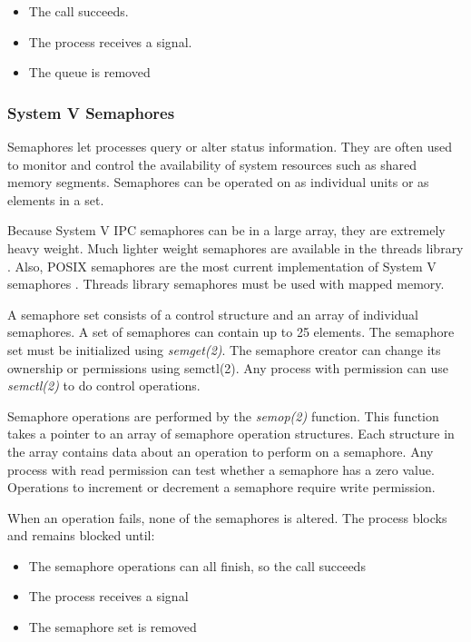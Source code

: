 \documentclass[12pt]{article}
\begin{document}
\begin{itemize}
	\item The call succeeds.
	
	
	\item The process receives a signal.	
		
	\item The queue is removed

\end{itemize}	


\subsubsection{System V Semaphores}

Semaphores let processes query or alter status information. They are often used to monitor and control the availability of system resources such as shared memory segments. Semaphores can be operated on as individual units or as elements in a set.

Because System V IPC semaphores can be in a large array, they are extremely heavy weight. Much lighter weight semaphores are available in the threads library . Also, POSIX semaphores are the most current implementation of System V semaphores . Threads library semaphores must be used with mapped memory.

A semaphore set consists of a control structure and an array of individual semaphores. A set of semaphores can contain up to 25 elements. The semaphore set must be initialized using \emph{semget(2)}. The semaphore creator can change its ownership or permissions using semctl(2). Any process with permission can use \emph{semctl(2)} to do control operations.

Semaphore operations are performed by the \emph{semop(2)} function. This function takes a pointer to an array of semaphore operation structures. Each structure in the array contains data about an operation to perform on a semaphore. Any process with read permission can test whether a semaphore has a zero value. Operations to increment or decrement a semaphore require write permission.

When an operation fails, none of the semaphores is altered. The process blocks and remains blocked until:

\begin{itemize}
	\item The semaphore operations can all finish, so the call succeeds
	
	
	\item The process receives a signal
		
	\item The semaphore set is removed

\end{itemize}	
\end{document}
